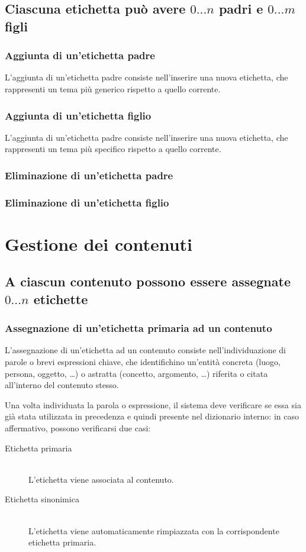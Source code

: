 \documentclass[10pt,a4paper,headinclude,footinclude,hidelinks]{scrreprt} %
\begin{document}
	\subsection[Gerarchia (padri e figli)]{Ciascuna etichetta può avere $0...n$ padri e $0...m$ figli}
	\subsubsection{Aggiunta di un'etichetta padre}
	L'aggiunta di un'etichetta padre consiste nell'inserire una nuova etichetta, che rappresenti un tema più generico rispetto a quello corrente.
	\subsubsection{Aggiunta di un'etichetta figlio}
	L'aggiunta di un'etichetta padre consiste nell'inserire una nuova etichetta, che rappresenti un tema più specifico rispetto a quello corrente.
	\subsubsection{Eliminazione di un'etichetta padre}
	\subsubsection{Eliminazione di un'etichetta figlio}

	\section{Gestione dei contenuti} %
	
	\subsection[Assegnazione etichette]{A ciascun contenuto possono essere assegnate $0...n$ etichette}
	\subsubsection{Assegnazione di un'etichetta primaria ad un contenuto}
	L'assegnazione di un'etichetta ad un contenuto consiste nell'individuazione di parole o brevi espressioni chiave, che identifichino un'entità concreta (luogo, persona, oggetto, \ldots) o astratta (concetto, argomento, \ldots) riferita o citata all'interno del contenuto stesso.
	
	Una volta individuata la parola o espressione, il sistema deve verificare se essa sia già stata utilizzata in precedenza e quindi presente nel dizionario interno: in caso affermativo, possono verificarsi due casi:
	\begin{description}
	\item[Etichetta primaria] \hfill \\
	L'etichetta viene associata al contenuto.
	\item[Etichetta sinonimica] \hfill \\
	L'etichetta viene automaticamente rimpiazzata con la corrispondente etichetta primaria.
	\end{description}
\end{document}
